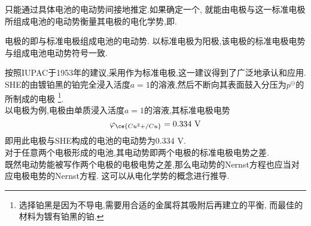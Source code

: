 \documentclass{ctexart}
\begin{document}
只能通过具体电池的电动势间接地推定.如果确定一个,%
就能由电极与这一标准电极所组成电池的电动势衡量其电极的电化学势,即.
\begin{definition}[6C.2.1 标准电极电势]
    电极的即与标准电极组成电池的电动势.%
    以标准电极为阳极,该电极的标准电极电势与组成电池电动势符号一致.
\end{definition}
按照IUPAC于1953年的建议,采用作为标准电极,这一建议得到了广泛地承认和应用.%
SHE的由镀铂黑的铂完全浸入活度$a=1$的溶液,然后不断向其表面鼓入分压为$p^\ominus$的所制成的电极%
\footnote{选择铂黑是因为不导电,需要用合适的金属将其吸附后再建立的平衡,%
而最佳的材料为镀有铂黑的铂.}.\\
\indent 以电极为例,电极由单质浸入活度$a=1$的溶液,其标准电极电势
\[\varphi_{\ce{Cu^2+/Cu}}=0.334\text{ V}\]
即用此电极与SHE构成的电池的电动势为$0.334\text{ V}$.\\
\indent 对于任意两个电极形成的电池,其电动势即两个电极的标准电极电势之差.\vspace{4pt}\\
\indent 既然电动势能被写作两个电极的电极电势之差,那么电动势的Nernst方程也应当对应电极电势的Nernst方程.%
这可以从电化学势的概念进行推导.
\end{document}
